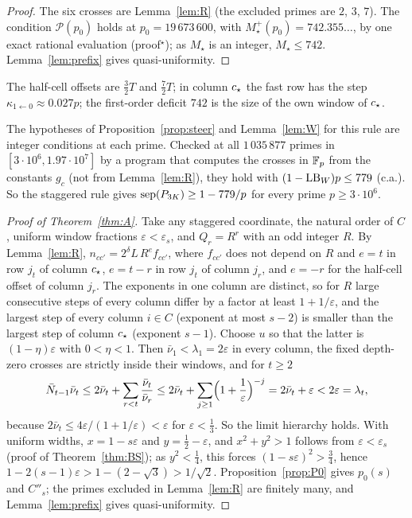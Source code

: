 \begin{proof}
The six crosses are Lemma~\ref{lem:R} (the excluded primes are $2$, $3$, $7$). The condition $\mathcal P(p_0)$ holds at $p_0=19\,673\,600$, with $M_\star^+(p_0)=742.355\ldots$, by one exact rational evaluation (proof${}^\star$); as $M_\star$ is an integer, $M_\star\le742$. Lemma~\ref{lem:prefix} gives quasi-uniformity.
\end{proof}

The half-cell offsets are $\frac32T$ and $\frac72T$; in column $c_{\star}$ the fast row has the step $\kappa_{1\leftarrow0}\approx0.027p$; the first-order deficit $742$ is the size of the own window of $c_{\star}$.

\begin{remark}\label{rem:A3range}
The hypotheses of Proposition~\ref{prop:steer} and Lemma~\ref{lem:W} for this rule are integer conditions at each prime. Checked at all $1\,035\,877$ primes in $[3\cdot10^6,1.97\cdot10^7]$ by a program that computes the crosses in $\mathbb{F}_p$ from the constants $g_c$ (not from Lemma~\ref{lem:R}), they hold with $(1-\mathrm{LB}_W)p\le779$ (c.a.). So the staggered rule gives $\operatorname{sep}(P_{3K})\ge1-779/p$ for every prime $p\ge3\cdot10^6$.
\end{remark}

\begin{proof}[Proof of Theorem~\ref{thm:A}]
Take any staggered coordinate, the natural order of $C$, uniform window fractions $\varepsilon<\varepsilon_s$, and $Q_r=R^r$ with an odd integer $R$. By Lemma~\ref{lem:R}, $n_{cc'}=2^\delta L\,R^{e}f_{cc'}$, where $f_{cc'}$ does not depend on $R$ and $e=t$ in row $j_t$ of column $c_{\star}$, $e=t-r$ in row $j_t$ of column $j_r$, and $e=-r$ for the half-cell offset of column $j_r$. The exponents in one column are distinct, so for $R$ large consecutive steps of every column differ by a factor at least $1+1/\varepsilon$, and the largest step of every column $i\in C$ (exponent at most $s-2$) is smaller than the largest step of column $c_{\star}$ (exponent $s-1$). Choose $u$ so that the latter is $(1-\eta)\varepsilon$ with $0<\eta<1$. Then $\bar\nu_1<\lambda_1=2\varepsilon$ in every column, the fixed depth-zero crosses are strictly inside their windows, and for $t\ge2$
\[
\bar N_{t-1}\bar\nu_t\le2\bar\nu_t+\sum_{r<t}\frac{\bar\nu_t}{\bar\nu_r}\le2\bar\nu_t+\sum_{j\ge1}\Bigl(1+\frac1\varepsilon\Bigr)^{-j}=2\bar\nu_t+\varepsilon<2\varepsilon=\lambda_t,
\]
because $2\bar\nu_t\le4\varepsilon/(1+1/\varepsilon)<\varepsilon$ for $\varepsilon<\frac13$. So the limit hierarchy holds. With uniform widths, $x=1-s\varepsilon$ and $y=\frac12-\varepsilon$, and $x^2+y^2>1$ follows from $\varepsilon<\varepsilon_s$ (proof of Theorem~\ref{thm:BS}); as $y^2<\frac14$, this forces $(1-s\varepsilon)^2>\frac34$, hence $1-2(s-1)\varepsilon>1-(2-\sqrt3)>1/\sqrt2$. Proposition~\ref{prop:P0} gives $p_0(s)$ and $C''_s$; the primes excluded in Lemma~\ref{lem:R} are finitely many, and Lemma~\ref{lem:prefix} gives quasi-uniformity.
\end{proof}

